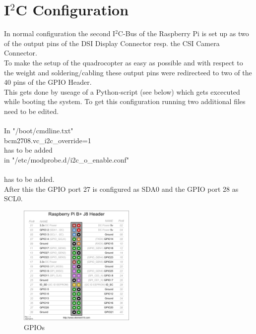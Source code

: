 \chapter{I$^2$C Configuration}
\label{chap:I2C}


In normal configuration the second I$^2$C-Bus of the Raspberry Pi is set up as two of the output pins of the DSI Display Connector resp. the CSI Camera Connector.\\
To make the setup of the quadrocopter as easy as possible and with respect to the weight and soldering/cabling these output pins were redirecteed to two of the 40 pins of the GPIO Header.\\

This gets done by useage of a Python-script (see below) which gets excecuted while booting the system. To get this configuration running two additional files need to be edited.\\\\
In "/boot/cmdline.txt"\\
\ttfamily bcm2708.vc\_i2c\_override=1 \\
\normalfont has to be added\\
in "/etc/modprobe.d/i2c\_o\_enable.conf"\\
 \\
\normalfont has to be added.\\

After this the GPIO port 27 is configured as SDA0 and the GPIO port 28 as SCL0.

\begin{figure}[H]
	\centering\includegraphics[width=0.5\textwidth]{fig/ch-i2c_configuration/gpios}
	\caption{GPIOs \footnotemark}
	\label{fig:gpios}
\end{figure}
\newpage







